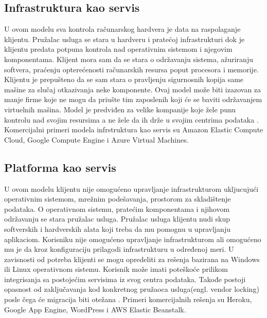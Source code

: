 \documentclass[12pt,oneside]{memoir}
\begin{document}
\subsection{Infrastruktura kao servis}

U ovom modelu sva kontrola računarskog hardvera je data na raspolaganje klijentu. Pružalac usluga se stara u hardveru i pratećoj infrastrukturi dok je klijentu predata potpuna kontrola nad operativnim sistemom i njegovim komponentama. Klijent mora sam da se stara o održavanju sistema, ažuriranju softvera, praćenju opterećenosti računarskih resursa poput procesora i memorije. Klijentu je prepušteno da se sam stara o pravljenju sigurnosnih kopija same mašine za slučaj otkazivanja neke komponente. Ovaj model može biti izazovan za manje firme koje ne mogu da priušte tim zaposlenih koji će se baviti održavanjem virtuelnih mašina. Model je predviđen za velike kompanije koje žele punu kontrolu nad svojim resursima a ne žele da ih drže u svojim centrima podataka \cite{cc}. Komercijalni primeri modela infrstruktura kao servis su Amazon Elastic Compute Cloud, Google Compute Engine i Azure Virtual Machines. %

 
\subsection{Platforma kao servis}
U ovom modelu klijentu nije omogućeno upravljanje infrastrukturom ukljucujući operativnim sistemom, mrežnim podešavanja, prostorom za skladištenje podataka. O operativnom sistemu, pratećim komponentama i njihovom održavanju se stara pružalac usluga. Pružalac usluga klijentu nudi skup softverskih i hardverskih alata koji treba da mu pomognu u upravljanju aplikaciom. Korisniku nije omogućeno upravljanje infrastrukturom ali omogućeno mu je da kroz konfiguraciju prilagodi infrastrukturu u određenoj meri. U zavisnosti od potreba klijenti se mogu opredeliti za rešenja bazirana na Windows ili Linux operativnom sistemu. Korisnik može imati poteškoće prilikom integrisanja sa postojećim servisima iz svog centra podataka. Takođe postoji opasnost od zaključavanja kod konkretnog pružaoca usluga(engl. vendor locking) posle čega će migracija biti otežana \cite{cc}. Primeri komercijalnih rešenja su Heroku, Google App Engine, WordPress i AWS Elastic Beanstalk. %
\end{document}

